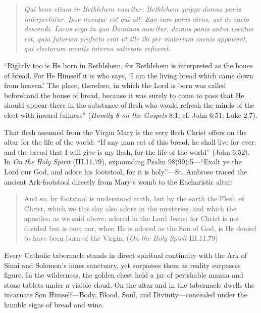 \begin{quote}\small
\textit{Qui bene etiam in Bethlehem nascitur: Bethlehem quippe domus panis interpretatur. Ipse namque est qui ait: Ego sum panis vivus, qui de caelo descendi. Locus ergo in quo Dominus nascitur, domus panis antea vocatus est, quia futurum profecto erat ut ille ibi per materiam carnis appareret, qui electorum mentis interna satietate reficeret.}
\end{quote}

``Rightly too is He born in Bethlehem, for Bethlehem is interpreted as the house of bread. For He Himself it is who says, `I am the living bread which came down from heaven.' The place, therefore, in which the Lord is born was called beforehand the house of bread, because it was surely to come to pass that He should appear there in the substance of flesh who would refresh the minds of the elect with inward fullness'' (\textit{Homily 8 on the Gospels} 8.1; cf. John 6:51; Luke 2:7).

That flesh assumed from the Virgin Mary is the very flesh Christ offers on the altar for the life of the world: ``If any man eat of this bread, he shall live for ever: and the bread that I will give is my flesh, for the life of the world'' (John 6:52). In \textit{On the Holy Spirit} (III.11.79), expounding Psalm 98(99):5---``Exalt ye the Lord our God, and adore his footstool, for it is holy''---St. Ambrose traced the ancient Ark-footstool directly from Mary's womb to the Eucharistic altar:

\begin{quote}\small
And so, by footstool is understood earth, but by the earth the Flesh of Christ, which we this day also adore in the mysteries, and which the apostles, as we said above, adored in the Lord Jesus; for Christ is not divided but is one; nor, when He is adored as the Son of God, is He denied to have been born of the Virgin. (\textit{On the Holy Spirit} III.11.79)
\end{quote}

Every Catholic tabernacle stands in direct spiritual continuity with the Ark of Sinai and Solomon's inner sanctuary, yet surpasses them as reality surpasses figure. In the wilderness, the golden chest held a jar of perishable manna and stone tablets under a visible cloud. On the altar and in the tabernacle dwells the incarnate Son Himself---Body, Blood, Soul, and Divinity---concealed under the humble signs of bread and wine.

